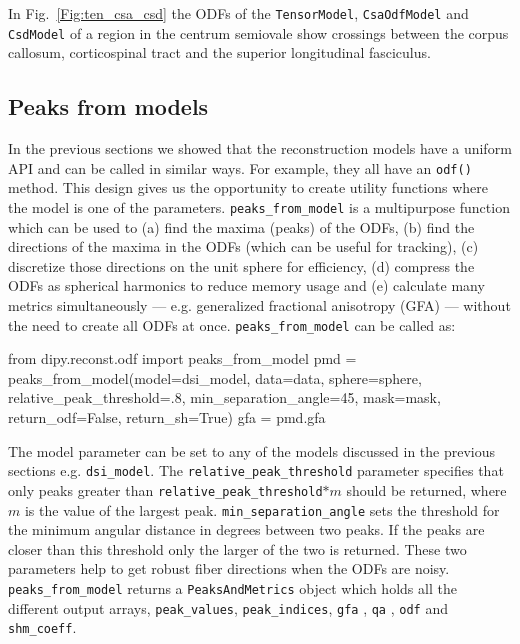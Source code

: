 \documentclass{bioinfo}
\begin{document}
In Fig.~\ref{Fig:ten_csa_csd} the ODFs of the \texttt{TensorModel},
\texttt{CsaOdfModel} and \texttt{CsdModel} of a region in the
centrum semiovale show crossings between the corpus callosum,
corticospinal tract and the superior longitudinal fasciculus.

\subsection{Peaks from models}
In the previous sections we showed that the reconstruction models have a
uniform API and can be called in similar ways. For example, they all have an
\texttt{odf()} method. This design gives us the opportunity to create utility functions
where the model is one of the parameters. \texttt{peaks\_from\_model} is a
multipurpose function which can be used to (a) find the maxima (peaks) of the
ODFs, (b) find the directions of the maxima in the ODFs (which can be useful for
tracking), (c) discretize those directions on the unit sphere for efficiency, (d)
compress the ODFs as spherical harmonics to reduce memory usage and (e)
calculate many metrics simultaneously --- e.g. generalized fractional anisotropy
(GFA) \citep{tuch:04} --- without the need to create all ODFs at
once. \texttt{peaks\_from\_model} can be called as:
\begin{python}
from dipy.reconst.odf import peaks_from_model
pmd = peaks_from_model(model=dsi_model,
                       data=data,
                       sphere=sphere,
                       relative_peak_threshold=.8,
                       min_separation_angle=45,
                       mask=mask,
                       return_odf=False,
                       return_sh=True)
gfa = pmd.gfa
\end{python}
The model parameter can be set to any of the models discussed in the previous sections
e.g. \texttt{dsi\_model}. The \texttt{relative\_peak\_threshold} parameter
specifies that only peaks greater than \texttt{relative\_peak\_threshold}$*m$
should be returned, where $m$ is the value of the largest
peak. \texttt{min\_separation\_angle} sets the threshold for the minimum
angular distance in degrees between two peaks. If the peaks are closer than
this threshold only the larger of the two is returned. These two parameters help
to get robust fiber directions when the ODFs are
noisy. \texttt{peaks\_from\_model} returns a \texttt{PeaksAndMetrics} object
which holds all the different output arrays, \texttt{peak\_values},
\texttt{peak\_indices}, \texttt{gfa} , \texttt{qa}
\citep{yeh-etal:10}, \texttt{odf} and \texttt{shm\_coeff}.
\end{document}
